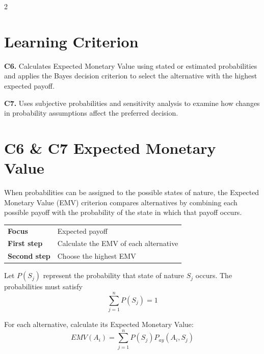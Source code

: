 	\begin{multicols}{2}
		\raggedcolumns
		
		\section*{Learning Criterion}
		
		\textbf{C6.}
		Calculates Expected Monetary Value using stated or estimated probabilities and applies the Bayes decision criterion to select the alternative with the highest expected payoff.
		
		\textbf{C7.}
		Uses subjective probabilities and sensitivity analysis to examine how changes in probability assumptions affect the preferred decision.
		\vspace{-5mm}
		
		
	\section{C6 \& C7 Expected Monetary Value}
	
	When probabilities can be assigned to the possible states of nature,
	the Expected Monetary Value (EMV) criterion compares alternatives by
	combining each possible payoff with the probability of the state in
	which that payoff occurs.
	
	\begin{center}
		\renewcommand{\arraystretch}{1.3}
		\small
		\begin{tabular}{p{}p{}}
			\toprule
			\textbf{Focus}
			& Expected payoff \\
			\textbf{First step}
			& Calculate the EMV of each alternative \\
			\textbf{Second step}
			& Choose the highest EMV \\
			\bottomrule
		\end{tabular}
	\end{center}
	
	Let $P(S_j)$ represent the probability that state of nature $S_j$
	occurs. The probabilities must satisfy
	$$
	\boxed{
		\sum_{j=1}^{n} P(S_j)=1
	}
	$$
	
	For each alternative, calculate its Expected Monetary Value:
	$$
	\boxed{
		EMV(A_i)
		=
		\sum_{j=1}^{n}
		P(S_j)P_{ay}(A_i,S_j)
	}
	$$
	

\end{multicols}

